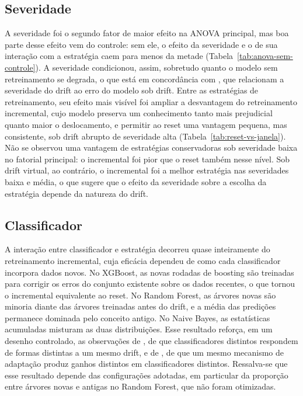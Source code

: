 \subsection{Severidade}

A severidade foi o segundo fator de maior efeito na ANOVA principal, mas
boa parte desse efeito vem do controle: sem ele, o efeito da severidade e o
de sua interação com a estratégia caem para menos da metade
(Tabela~\ref{tab:anova-sem-controle}). A severidade condicionou, assim,
sobretudo quanto o modelo sem retreinamento se degrada, o que está em
concordância com , que relacionam a severidade
do drift ao erro do modelo sob drift. Entre as estratégias de
retreinamento, seu efeito mais visível foi ampliar a desvantagem do
retreinamento incremental, cujo modelo preserva um conhecimento tanto mais
prejudicial quanto maior o deslocamento, e permitir ao reset uma vantagem
pequena, mas consistente, sob drift abrupto de severidade alta
(Tabela~\ref{tab:reset-vs-janela}). Não se
observou uma vantagem de estratégias conservadoras sob severidade baixa no
fatorial principal: o incremental foi pior que o reset também nesse nível.
Sob drift virtual, ao contrário, o incremental foi a melhor estratégia nas
severidades baixa e média, o que sugere que o efeito da severidade sobre a
escolha da estratégia depende da natureza do drift.

\subsection{Classificador}

A interação entre classificador e estratégia decorreu quase inteiramente do
retreinamento incremental, cuja eficácia dependeu de como cada classificador
incorpora dados novos. No XGBoost, as novas rodadas de boosting são
treinadas para corrigir os erros do conjunto existente sobre os dados
recentes, o que tornou o incremental equivalente ao reset. No Random Forest,
as árvores novas são minoria diante das árvores treinadas antes do drift, e
a média das predições permanece dominada pelo conceito antigo. No Naive
Bayes, as estatísticas acumuladas misturam as duas distribuições. Esse
resultado reforça, em um desenho controlado, as observações de
, de que classificadores distintos respondem de formas
distintas a um mesmo drift, e de , de que um mesmo
mecanismo de adaptação produz ganhos distintos em classificadores
distintos. Ressalva-se que esse resultado depende das configurações
adotadas, em particular da proporção entre árvores novas e antigas no Random
Forest, que não foram otimizadas.


